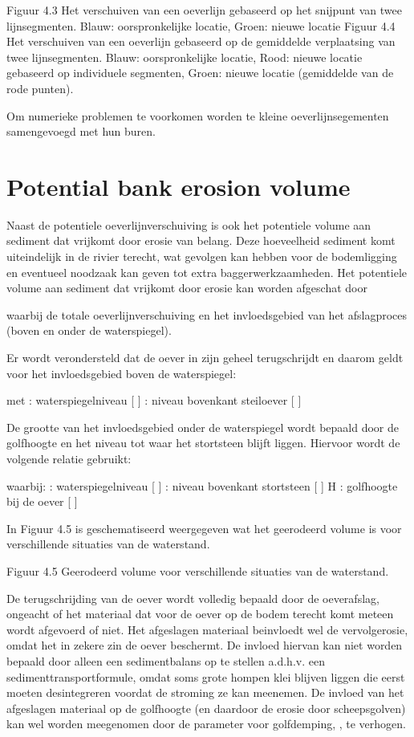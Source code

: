  	
Figuur 4.3 Het verschuiven van een oeverlijn gebaseerd op het snijpunt van twee lijnsegmenten.
Blauw: oorspronkelijke locatie, Groen: nieuwe locatie
	Figuur 4.4	Het verschuiven van een oeverlijn gebaseerd op de gemiddelde verplaatsing van twee lijnsegmenten.
Blauw: oorspronkelijke locatie, Rood: nieuwe locatie gebaseerd op individuele segmenten, Groen: nieuwe locatie (gemiddelde van de rode punten).

Om numerieke problemen te voorkomen worden te kleine oeverlijnsegementen samengevoegd met hun buren.

\section{Potential bank erosion volume}

Naast de potentiele oeverlijnverschuiving is ook het potentiele volume aan sediment dat vrijkomt door erosie van belang.
Deze hoeveelheid sediment komt uiteindelijk in de rivier terecht, wat gevolgen kan hebben voor de bodemligging en eventueel noodzaak kan geven tot extra baggerwerkzaamheden.
Het potentiele volume aan sediment dat vrijkomt door erosie kan worden afgeschat door

	

waarbij   de totale oeverlijnverschuiving en   het invloedsgebied van het afslagproces (boven en onder de waterspiegel).

Er wordt verondersteld dat de oever in zijn geheel terugschrijdt en daarom geldt voor het invloedsgebied boven de waterspiegel:
	
met
 	: waterspiegelniveau [ ]
 	: niveau bovenkant steiloever [ ]

De grootte van het invloedsgebied onder de waterspiegel wordt bepaald door de golfhoogte en het niveau tot waar het stortsteen blijft liggen.
Hiervoor wordt de volgende relatie gebruikt:

	
waarbij:
 	: waterspiegelniveau [ ]
 	: niveau bovenkant stortsteen [ ]
H	: golfhoogte bij de oever [ ]

In Figuur 4.5 is geschematiseerd weergegeven wat het geerodeerd volume is voor verschillende situaties van de waterstand.


	 	

Figuur 4.5 Geerodeerd volume voor verschillende situaties van de waterstand.


De terugschrijding van de oever wordt volledig bepaald door de oeverafslag, ongeacht of het materiaal dat voor de oever op de bodem terecht komt meteen wordt afgevoerd of niet.
Het afgeslagen materiaal beinvloedt wel de vervolgerosie, omdat het in zekere zin de oever beschermt.
De invloed hiervan kan niet worden bepaald door alleen een sedimentbalans op te stellen a.d.h.v.
een sedimenttransportformule, omdat soms grote hompen klei blijven liggen die eerst moeten desintegreren voordat de stroming ze kan meenemen.
De invloed van het afgeslagen materiaal op de golfhoogte (en daardoor de erosie door scheepsgolven) kan wel worden meegenomen door de parameter voor golfdemping, , te verhogen.

